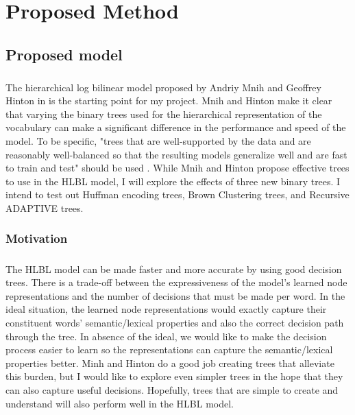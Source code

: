 

\chapter{Proposed Method}

\section{Proposed model} \label{sec:proposedModel}
\paragraph{}
The hierarchical log bilinear model proposed by Andriy Mnih and Geoffrey Hinton in \cite{MnihHinton2009} is the starting point for my project. Mnih and Hinton make it clear that varying the binary trees used for the hierarchical representation of the vocabulary can make a significant difference in the performance and speed of the model. To be specific, "trees
that are well-supported by the data and are reasonably well-balanced so that the resulting models
generalize well and are fast to train and test" should be used \cite[pg. 5]{MnihHinton2009}. While Mnih and Hinton propose  effective trees to use in the HLBL model, I will explore the effects of three new binary trees. I intend to test out Huffman encoding trees, Brown Clustering trees, and Recursive ADAPTIVE trees.
\subsection{Motivation}
\paragraph{}
The HLBL model can be made faster and more accurate by using good decision trees. There is a trade-off between the expressiveness of the model's learned node representations and the number of decisions that must be made per word. In the ideal situation, the learned node representations would exactly capture their constituent words' semantic/lexical properties and also the correct decision path through the tree. In absence of the ideal, we would like to make the decision process easier to learn so the representations can capture the semantic/lexical properties better. Minh and Hinton do a good job creating trees that alleviate this burden, but I would like to explore even simpler trees in the hope that they can also capture useful decisions. Hopefully, trees that are simple to create and understand will also perform well in the HLBL model. 

